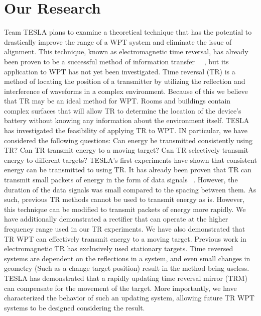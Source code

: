 \section{Our Research}
Team TESLA plans to examine a theoretical technique that has the potential to drastically improve the range of a WPT system and eliminate the issue of alignment. This technique, known as electromagnetic time reversal, has already been proven to be a successful method of information transfer ~\cite{nltr-wave-chaotic}~\cite{cepni2005experimental}, but its application to WPT has not yet been investigated. Time reversal (TR) is a method of locating the position of a transmitter by utilizing the reflection and interference of waveforms in a complex environment. Because of this we believe that TR may be an ideal method for WPT. Rooms and buildings contain complex surfaces that will allow TR to determine the location of the device's battery without knowing any information about the environment itself.
TESLA has investigated the feasibility of applying TR to WPT. IN particular, we have considered the following questions: Can energy be transmitted consistently using TR? Can TR transmit energy to a moving target? Can TR selectively transmit energy to different targets?
TESLA's first experiments have shown that consistent energy  can be transmitted to using TR. It has already been proven that TR can transmit small packets of energy in the form of data signals ~\cite{nltr-wave-chaotic}. However, the duration of the data signals was small compared to the spacing between them. As such, previous TR methods cannot be used to transmit energy as is.  However, this technique can be modified to transmit packets of energy more rapidly.  We have additionally demonstrated a rectifier that can operate at the higher frequency range used in our TR experiments.
We have also demonstrated that TR WPT can effectively transmit energy to a moving target. Previous work in electromagnetic TR has exclusively used stationary targets. Time reversed systems are dependent on the reflections in a system, and even small changes in geometry (Such as a change target position) result in the method being useless.  TESLA has demonstrated that a rapidly updating time reversal mirror (TRM) can compensate for the movement of the target.  More importantly, we have characterized the behavior of such an updating system, allowing future TR WPT systems to be designed considering the result.

